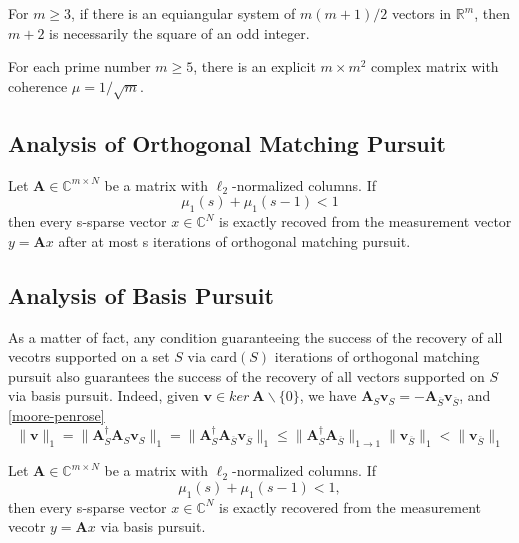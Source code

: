 \begin{theorem}
    \label{1.12}
    For $m \geq 3$, if there is an equiangular system of $m(m+1)/2$ vectors in $\mathbb{R}^m$, then $m+2$ is necessarily the square of an odd integer.
\end{theorem}

\begin{proposition}
    \label{pr1.13}
    For each prime number $m \geq 5$, there is an explicit $m \times m^2$ complex matrix with coherence $\mu = 1/\sqrt{m}$.
\end{proposition}

\subsection{Analysis of Orthogonal Matching Pursuit}
\begin{theorem}
    \label{th1.14}
    Let $\mathbf{A} \in \mathbb{C}^{m \times N}$ be a matrix with $\ell_2$-normalized columns. If 
    \begin{equation}
        \mu_1(s) + \mu_1(s-1) < 1
        \label{eq1.11}
    \end{equation}
    then every s-sparse vector $x \in \mathbb{C}^N$ is exactly recoved from the measurement vector $y = \mathbf{A}x$ after at most s iterations of orthogonal matching pursuit.
\end{theorem}

\subsection{Analysis of Basis Pursuit}
As a matter of fact, any condition guaranteeing the success of the recovery of all vecotrs supported on a set $S$ via card$(S)$ iterations of orthogonal matching pursuit also guarantees the success of the recovery of all vectors supported on $S$ via basis pursuit. Indeed, given $\mathbf{v} \in ker\ \mathbf{A} \backslash \{0\}$, we have $\mathbf{A}_S\mathbf{v}_S = -\mathbf{A}_{\overline{S}} \mathbf{v}_{\overline{S}}$, and \cref{moore-penrose} 
\[
    \|\mathbf{v}\|_1 = \|\mathbf{A}_S^{\dagger} \mathbf{A}_S \mathbf{v}_S\|_1 = \|\mathbf{A}_S^{\dagger}\mathbf{A}_{\overline{S}}\mathbf{v}_{\overline{S}}\|_1 \leq \|\mathbf{A}_S^{\dagger} \mathbf{A}_{\overline{S}}\|_{1 \rightarrow 1}\|\mathbf{v}_{\overline{S}}\|_1 < \|\mathbf{v}_{\overline{S}}\|_1
\]

\begin{theorem}
    \label{th1.15}
    Let $\mathbf{A} \in \mathbb{C}^{m \times N}$ be a matrix with $\ell_2$-normalized columns. If 
    \begin{equation}
        \mu_1(s) + \mu_1(s-1) < 1,
        \label{eq1.13}
    \end{equation}
    then every s-sparse vector $x \in \mathbb{C}^N$ is exactly recovered from the measurement vecotr $y = \mathbf{A}x$ via basis pursuit.
\end{theorem}

